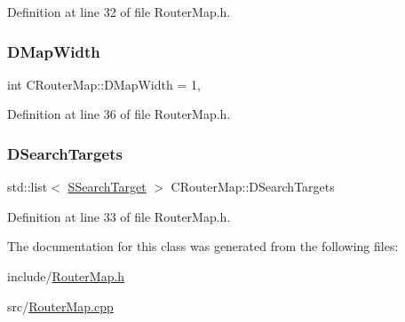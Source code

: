 Definition at line 32 of file Router\+Map.\+h.

\hypertarget{classCRouterMap_a9899b7a017d376a16af153f6f91159d3}{}\label{classCRouterMap_a9899b7a017d376a16af153f6f91159d3} 
\subsubsection{\texorpdfstring{D\+Map\+Width}{DMapWidth}}
{\footnotesize\ttfamily int C\+Router\+Map\+::\+D\+Map\+Width = 1\hspace{0.3cm}{\ttfamily [static]}, {\ttfamily [protected]}}



Definition at line 36 of file Router\+Map.\+h.

\hypertarget{classCRouterMap_a903a8d0891e61b169e6aa72da27d62ba}{}\label{classCRouterMap_a903a8d0891e61b169e6aa72da27d62ba} 
\subsubsection{\texorpdfstring{D\+Search\+Targets}{DSearchTargets}}
{\footnotesize\ttfamily std\+::list$<$ \hyperlink{structCRouterMap_1_1SSearchTarget}{S\+Search\+Target} $>$ C\+Router\+Map\+::\+D\+Search\+Targets\hspace{0.3cm}{\ttfamily [protected]}}



Definition at line 33 of file Router\+Map.\+h.



The documentation for this class was generated from the following files\+:\begin{DoxyCompactItemize}
\item 
include/\hyperlink{RouterMap_8h}{Router\+Map.\+h}\item 
src/\hyperlink{RouterMap_8cpp}{Router\+Map.\+cpp}\end{DoxyCompactItemize}
